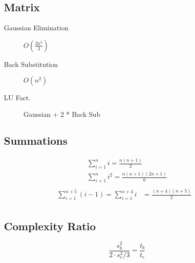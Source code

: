 \documentclass[10pt]{article}
\begin{document}
\begin{multicols}{3}
    \begin{minipage}{\columnwidth}
        \subsection*{Matrix}
        \begin{description}
            \item[Gaussian Elimination] \(O(\frac{2n^3}{3})\)
            \item[Back Substitution] \(O(n^2)\)
            \item[LU Fact.] Gaussian + 2 * Back Sub
        \end{description}
    \end{minipage}

    \begin{minipage}{\columnwidth}
        \subsection*{Summations}
        \begin{multicols}{2}
            \vspace*{-2em}
            \begin{equation*}
                \begin{aligned}
                     & \sum_{i=1}^{n} i = \frac{n(n+1)}{2}         & \\
                     & \sum_{i=1}^{n} i^2 = \frac{n(n+1)(2n+1)}{6} & \\
                \end{aligned}
            \end{equation*}
            \columnbreak
            \vspace*{-2.0em}
            \begin{equation*}
                \begin{aligned}
                    \sum_{i=1}^{n+5}{(i-1)} = \sum_{i=1}^{n+4} i & = \frac{(n+4)(n+5)}{2} & \\
                \end{aligned}
            \end{equation*}
        \end{multicols}
    \end{minipage}

    \begin{minipage}{1.3\columnwidth}
        \begin{center}
            \subsection*{Complexity Ratio}
        \end{center}
        \begin{equation*}
            \frac{s_b^2}{2\cdot s_e^3 / 3} = \frac{t_b}{t_e}
        \end{equation*}
    \end{minipage}
\end{multicols}
\end{document}
